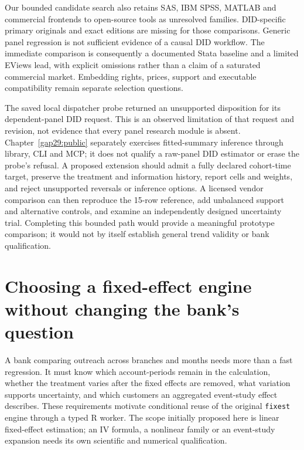 Our bounded candidate search also retains SAS, IBM SPSS, MATLAB and
commercial frontends to open-source tools as unresolved families.
DID-specific primary originals and exact editions are missing for those
comparisons. Generic panel regression is not sufficient evidence of a
causal DID workflow. The immediate comparison is consequently a documented
Stata baseline and a limited EViews lead, with explicit omissions rather
than a claim of a saturated commercial market. Embedding rights, prices,
support and executable compatibility remain separate selection questions.

The saved local dispatcher probe returned an unsupported disposition for
its dependent-panel DID request. This is an observed limitation of that
request and revision, not evidence that every panel research module is absent.
Chapter~\ref{gap29:public} separately exercises fitted-summary inference through
library, CLI and MCP; it does not qualify a raw-panel DID estimator or erase
the probe's refusal. A proposed extension should admit a
fully declared cohort-time target, preserve the treatment and information
history, report cells and weights, and reject unsupported reversals or
inference options. A licensed vendor comparison can then reproduce the
15-row reference, add unbalanced support and alternative controls, and
examine an independently designed uncertainty trial. Completing this
bounded path would provide a meaningful prototype comparison; it would
not by itself establish general trend validity or bank qualification.
\citep{exec18_gp_dispatch,exec18_gp_panel_reference}


\section{Choosing a fixed-effect engine without changing the bank's question}
\label{exec20:fx-scope}
A bank comparing outreach across branches and months needs more than a fast
regression. It must know which account-periods remain in the calculation, whether
the treatment varies after the fixed effects are removed, what variation supports
uncertainty, and which customers an aggregated event-study effect describes.
These requirements motivate conditional reuse of the original \texttt{fixest}
engine through a typed R worker. The scope initially proposed here is linear
fixed-effect estimation; an IV formula, a nonlinear family or an event-study
expansion needs its own scientific and numerical qualification.

